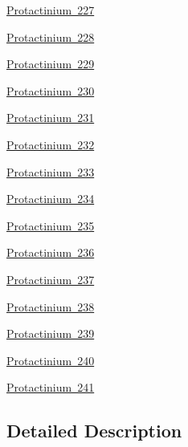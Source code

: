 \begin{DoxyCompactItemize}
\mbox{\hyperlink{group___isotope_const-_protactinium-_pa227}{Protactinium 227}}
\item 
\mbox{\hyperlink{group___isotope_const-_protactinium-_pa228}{Protactinium 228}}
\item 
\mbox{\hyperlink{group___isotope_const-_protactinium-_pa229}{Protactinium 229}}
\item 
\mbox{\hyperlink{group___isotope_const-_protactinium-_pa230}{Protactinium 230}}
\item 
\mbox{\hyperlink{group___isotope_const-_protactinium-_pa231}{Protactinium 231}}
\item 
\mbox{\hyperlink{group___isotope_const-_protactinium-_pa232}{Protactinium 232}}
\item 
\mbox{\hyperlink{group___isotope_const-_protactinium-_pa233}{Protactinium 233}}
\item 
\mbox{\hyperlink{group___isotope_const-_protactinium-_pa234}{Protactinium 234}}
\item 
\mbox{\hyperlink{group___isotope_const-_protactinium-_pa235}{Protactinium 235}}
\item 
\mbox{\hyperlink{group___isotope_const-_protactinium-_pa236}{Protactinium 236}}
\item 
\mbox{\hyperlink{group___isotope_const-_protactinium-_pa237}{Protactinium 237}}
\item 
\mbox{\hyperlink{group___isotope_const-_protactinium-_pa238}{Protactinium 238}}
\item 
\mbox{\hyperlink{group___isotope_const-_protactinium-_pa239}{Protactinium 239}}
\item 
\mbox{\hyperlink{group___isotope_const-_protactinium-_pa240}{Protactinium 240}}
\item 
\mbox{\hyperlink{group___isotope_const-_protactinium-_pa241}{Protactinium 241}}
\end{DoxyCompactItemize}


\subsection{Detailed Description}

